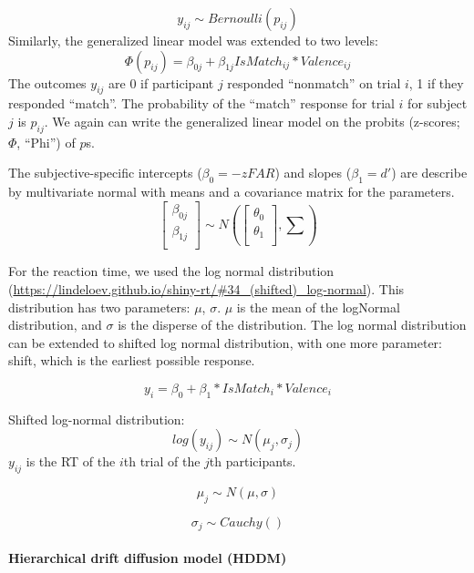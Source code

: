 \documentclass[
  english,
  man]{apa6}
\let\oldparagraph\paragraph
\renewcommand{\paragraph}[1]{\oldparagraph{#1}\mbox{}}
\begin{document}
\[ y_{ij} \sim Bernoulli(p_{ij})\]
Similarly, the generalized linear model was extended to two levels:
\[ \Phi(p_{ij}) =  \beta_{0j} + \beta_{1j}IsMatch_{ij} * Valence_{ij}\]
The outcomes \(y_{ij}\) are 0 if participant \(j\) responded \enquote{nonmatch} on trial \(i\), 1 if they responded \enquote{match}. The probability of the \enquote{match} response for trial \(i\) for subject \(j\) is \(p_{ij}\). We again can write the generalized linear model on the probits (z-scores; \(\Phi\), \enquote{Phi}) of \(p\)s.

The subjective-specific intercepts (\(\beta_{0} = -zFAR\)) and slopes (\(\beta_{1} = d'\)) are describe by multivariate normal with means and a covariance matrix for the parameters.
\[ \begin{bmatrix}\beta_{0j}\\
\beta_{1j}\\
\end{bmatrix} \sim N(\begin{bmatrix}\theta_{0}\\
\theta_{1}\\
\end{bmatrix}, \sum) \]

For the reaction time, we used the log normal distribution (\url{https://lindeloev.github.io/shiny-rt/\#34_(shifted)_log-normal}). This distribution has two parameters: \(\mu\), \(\sigma\). \(\mu\) is the mean of the logNormal distribution, and \(\sigma\) is the disperse of the distribution. The log normal distribution can be extended to shifted log normal distribution, with one more parameter: shift, which is the earliest possible response.

\[y_{i} = \beta_{0} + \beta_{1}*IsMatch_{i} * Valence_{i}\]

Shifted log-normal distribution:
\[ log(y_{ij}) \sim N(\mu_{j}, \sigma_{j})\]
\(y_{ij}\) is the RT of the \(i\)th trial of the \(j\)th participants.

\[\mu_{j} \sim N(\mu, \sigma)\]

\[\sigma_{j} \sim Cauchy()\]

\hypertarget{hierarchical-drift-diffusion-model-hddm}{%
\paragraph{Hierarchical drift diffusion model (HDDM)}\label{hierarchical-drift-diffusion-model-hddm}}
\end{document}
